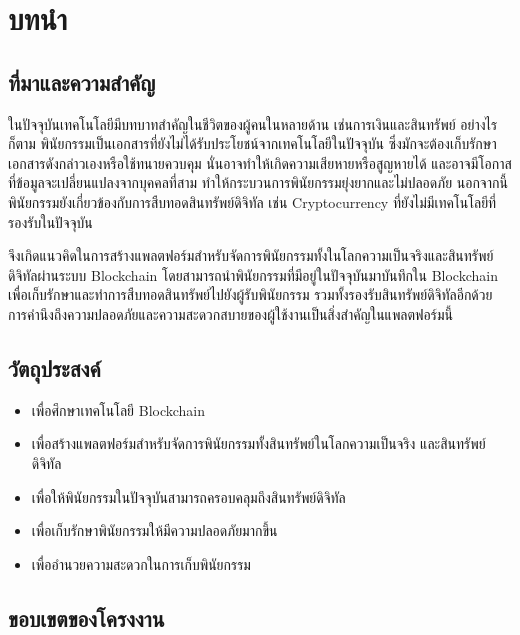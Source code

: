 \documentclass[12pt,oneside,openright,a4paper]{cpe-thai-project}
\begin{document}


\chapter{บทนำ}

\section{ที่มาและความสำคัญ}

\tab ในปัจจุบันเทคโนโลยีมีบทบาทสำคัญในชีวิตของผู้คนในหลายด้าน เช่นการเงินและสินทรัพย์ อย่างไรก็ตาม พินัยกรรมเป็นเอกสารที่ยังไม่ได้รับประโยชน์จากเทคโนโลยีในปัจจุบัน ซึ่งมักจะต้องเก็บรักษาเอกสารดังกล่าวเองหรือใช้ทนายควบคุม นั่นอาจทำให้เกิดความเสียหายหรือสูญหายได้ และอาจมีโอกาสที่ข้อมูลจะเปลี่ยนแปลงจากบุคคลที่สาม ทำให้กระบวนการพินัยกรรมยุ่งยากและไม่ปลอดภัย นอกจากนี้ พินัยกรรมยังเกี่ยวข้องกับการสืบทอดสินทรัพย์ดิจิทัล เช่น Cryptocurrency ที่ยังไม่มีเทคโนโลยีที่รองรับในปัจจุบัน

\tab จึงเกิดแนวคิดในการสร้างแพลตฟอร์มสำหรับจัดการพินัยกรรมทั้งในโลกความเป็นจริงและสินทรัพย์ดิจิทัลผ่านระบบ Blockchain โดยสามารถนำพินัยกรรมที่มีอยู่ในปัจจุบันมาบันทึกใน Blockchain เพื่อเก็บรักษาและทำการสืบทอดสินทรัพย์ไปยังผู้รับพินัยกรรม รวมทั้งรองรับสินทรัพย์ดิจิทัลอีกด้วย การคำนึงถึงความปลอดภัยและความสะดวกสบายของผู้ใช้งานเป็นสิ่งสำคัญในแพลตฟอร์มนี้


\section{วัตถุประสงค์}

\begin{itemize}
\item เพื่อศึกษาเทคโนโลยี Blockchain
\item เพื่อสร้างแพลตฟอร์มสำหรับจัดการพินัยกรรมทั้งสินทรัพย์ในโลกความเป็นจริง และสินทรัพย์ดิจิทัล
\item เพื่อให้พินัยกรรมในปัจจุบันสามารถครอบคลุมถึงสินทรัพย์ดิจิทัล
\item เพื่อเก็บรักษาพินัยกรรมให้มีความปลอดภัยมากขึ้น
\item เพื่ออำนวยความสะดวกในการเก็บพินัยกรรม
\end{itemize}

\section{ขอบเขตของโครงงาน}
\end{document}
